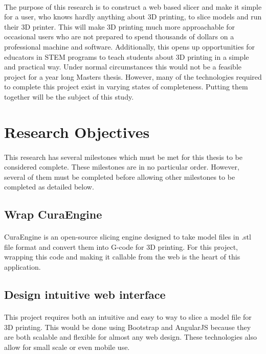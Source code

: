 \paragraph{}
The purpose of this research is to construct a web based slicer and make it simple for a user, who knows hardly anything about 3D printing, to slice models and run their 3D printer.
This will make 3D printing much more approachable for occasional users who are not prepared to spend thousands of dollars on a professional machine and software.
Additionally, this opens up opportunities for educators in STEM programs to teach students about 3D printing in a simple and practical way.
Under normal circumstances this would not be a feasible project for a year long Masters thesis.
However, many of the technologies required to complete this project exist in varying states of completeness.
Putting them together will be the subject of this study.


\section{Research Objectives}
\paragraph{}
This research has several milestones which must be met for this thesis to be considered complete.
These milestones are in no particular order.
However, several of them must be completed before allowing other milestones to be completed as detailed below.

\subsection{Wrap CuraEngine}
\paragraph{}
CuraEngine is an open-source slicing engine designed to take model files in .stl file format and convert them into G-code for 3D printing.
For this project, wrapping this code and making it callable from the web is the heart of this application.

\subsection{Design intuitive web interface}
\paragraph{}
This project requires both an intuitive and easy to way to slice a model file for 3D printing.
This would be done using Bootstrap and AngularJS because they are both scalable and flexible for almost any web design.
These technologies also allow for small scale or even mobile use.

